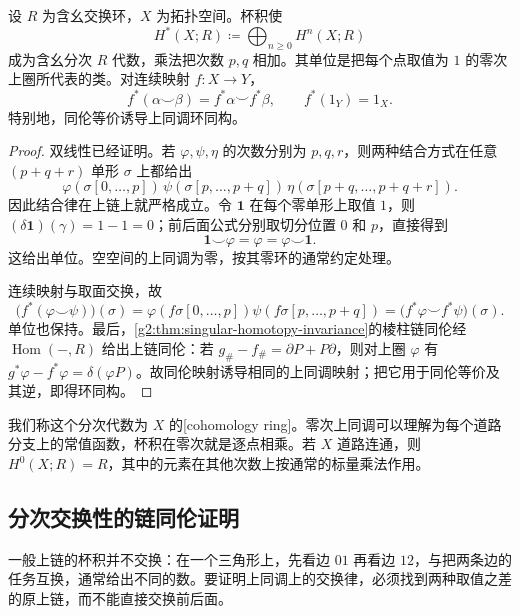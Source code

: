 \begin{theorem}\label{g2:thm:cup-properties}
	设 \(R\) 为含幺交换环，\(X\) 为拓扑空间。杯积使
	\[
		H^*(X;R)\coloneqq\bigoplus_{n\ge0}H^n(X;R)
	\]
	成为含幺分次 \(R\) 代数，乘法把次数 \(p,q\) 相加。其单位是把每个点取值为 \(1\) 的零次上圈所代表的类。对连续映射 \(f:X\to Y\)，
	\[
		f^*(\alpha\smile\beta)=f^*\alpha\smile f^*\beta,
		\qquad f^*(1_Y)=1_X.
	\]
	特别地，同伦等价诱导上同调环同构。
\end{theorem}
\begin{proof}
	双线性已经证明。若 \(\varphi,\psi,\eta\) 的次数分别为 \(p,q,r\)，则两种结合方式在任意 \((p+q+r)\) 单形 \(\sigma\) 上都给出
	\[
		\varphi(\sigma[0,\ldots,p])\,
		\psi(\sigma[p,\ldots,p+q])\,
		\eta(\sigma[p+q,\ldots,p+q+r]).
	\]
	因此结合律在上链上就严格成立。令 \(\mathbf1\) 在每个零单形上取值 \(1\)，则 \((\delta\mathbf1)(\gamma)=1-1=0\)；前后面公式分别取切分位置 \(0\) 和 \(p\)，直接得到
	\[
		\mathbf1\smile\varphi=\varphi=\varphi\smile\mathbf1.
	\]
	这给出单位。空空间的上同调为零，按其零环的通常约定处理。

	连续映射与取面交换，故
	\[
		\bigl(f^*(\varphi\smile\psi)\bigr)(\sigma)
		=\varphi(f\sigma[0,\ldots,p])\psi(f\sigma[p,\ldots,p+q])
		=\bigl(f^*\varphi\smile f^*\psi\bigr)(\sigma).
	\]
	单位也保持。最后，\cref{g2:thm:singular-homotopy-invariance}的棱柱链同伦经 \(\operatorname{Hom}(-,R)\) 给出上链同伦：若 \(g_\#-f_\#=\partial P+P\partial\)，则对上圈 \(\varphi\) 有 \(g^*\varphi-f^*\varphi=\delta(\varphi P)\)。故同伦映射诱导相同的上同调映射；把它用于同伦等价及其逆，即得环同构。
\end{proof}

我们称这个分次代数为 \(X\) 的[cohomology ring]。零次上同调可以理解为每个道路分支上的常值函数，杯积在零次就是逐点相乘。若 \(X\) 道路连通，则 \(H^0(X;R)=R\)，其中的元素在其他次数上按通常的标量乘法作用。

\subsection{分次交换性的链同伦证明}
\label{g2:subsec:0404:03}

一般上链的杯积并不交换：在一个三角形上，先看边 \(01\) 再看边 \(12\)，与把两条边的任务互换，通常给出不同的数。要证明上同调上的交换律，必须找到两种取值之差的原上链，而不能直接交换前后面。

